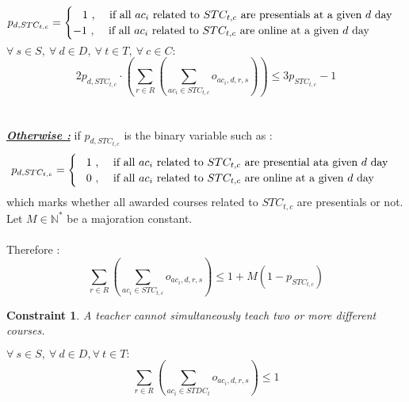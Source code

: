 \documentclass[12pt,a4paper]{article}
\newtheorem{theorem}{Constraint}
\begin{document}
	$$
	p_{d, STC_{t,c}} = 
	\begin{cases}
		\hspace{0.3cm} 1 \text{ , \quad if all $ac_i$ related to  $STC_{t,c}$ are presentials at a given $d$ day} \\
		-1 \text{ , \quad if all $ac_i$ related to  $STC_{t,c}$ are online at a given $d$ day}
	\end{cases} 
	$$
$
\forall \ s \in S,\ \forall \ d \in D, \ \forall \ t \in T, \ \forall \ c \in C :
$
\begin{equation}
2p_{d, STC_{t,c}} \cdot \left( \sum_{r\in R}\left(\sum_{ac_{i} \in STC_{t,c}}{o_{ac_{i}, d, r, s}}\right)\right) \leq 3p_{STC_{t,c}} - 1
\end{equation}
\\ \\
\textbf{\textit{\underline{Otherwise :}}}
if $p_{d, STC_{t,c}}$ is the binary variable such as :
\[
	p_{d, STC_{t,c}} = 
	\begin{cases}
		\hspace{0.3cm} 1 \text{ , \quad if all $ac_i$ related to $STC_{t,c}$ are presential ata given $d$ day} \\
		\hspace{0.3cm}0 \text{ , \quad if all $ac_i$ related to  $STC_{t,c}$ are online at a given $d$ day}
	\end{cases} 
\]	
which marks whether all awarded courses related to $STC_{t,c}$ are presentials or not. \\

Let $M \in \mathbb{N^{*}}$ be a majoration constant. \\ \\
Therefore :
\begin{equation}
\sum_{r\in R}\left(\sum_{ac_{i} \in STC_{t,c}}{o_{ac_{i}, d, r, s}}\right) \leq 1 + M(1 - p_{STC_{t,c}})
\end{equation}

\begin{theorem}
A teacher cannot simultaneously teach two or more different courses.
\end{theorem}
$
\forall \ s \in S,\ \forall \ d \in D, \forall \ t \in T:
$
\begin{equation}
\sum_{r\in R}\left(\sum_{ac_i \in STDC_{t}}{o_{ac_{i}, d, r, s}}\right) \leq 1
\end{equation}
\end{document}
